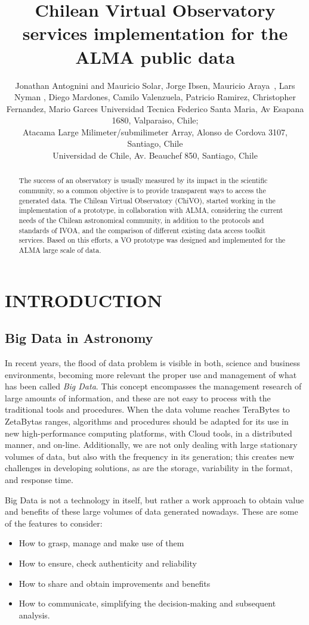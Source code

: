 \documentclass[]{spie}
\title{Chilean Virtual Observatory services implementation for the ALMA public data}
\author{Jonathan Antognini\supit{a} and Mauricio Solar\supit{a}, Jorge Ibsen\supit{b}, Mauricio Araya \supit{a}, 
Lars Nyman \supit{b}, Diego Mardones\supit{c}, Camilo Valenzuela\supit{a}, Patricio Ramirez\supit{a}, 
Christopher Fernandez\supit{a}, Mario Garces\supit{a}
\skiplinehalf
\supit{a}Universidad Tecnica Federico Santa Maria, Av Esapana 1680, Valparaiso, Chile; \\
\supit{b}Atacama Large Milimeter/submilimeter Array, Alonso de Cordova 3107, Santiago, Chile \\
\supit{c}Universidad de Chile, Av. Beauchef 850, Santiago, Chile \\
}
\begin{document}
 
\maketitle 

\begin{abstract}
The success of an observatory is usually measured by its impact in the
scientific community, so a common objective is to provide transparent ways to
access the generated data. The Chilean Virtual Observatory (ChiVO), started
working in the implementation of a prototype, in collaboration with ALMA,
considering the current needs of the Chilean astronomical community, in
addition to the protocols and standards of IVOA, and the comparison of
different existing data access toolkit services. Based on this efforts, a VO
prototype was designed and implemented for the ALMA large scale of data.
\end{abstract}


\section{INTRODUCTION}
\label{sec:intro}  %

\subsection{Big Data in Astronomy}
\label{sec:bdastronomy}
In recent years, the flood of data problem is visible in both, science and
business environments, becoming more relevant the proper use and management of
what has been called \emph{Big Data}. This concept encompasses the management research
of large amounts of information, and these are not easy to process with the
traditional tools and procedures.  When the data volume reaches TeraBytes to
ZetaBytas ranges, algorithms and procedures should be adapted for its use in
new high-performance computing platforms, with Cloud tools, in a distributed
manner, and on-line.  Additionally, we are not only dealing with large
stationary volumes of data, but also with the frequency in its generation; this
creates new challenges in developing solutions, as are the storage, variability
in the format, and response time.  

Big Data is not a technology in itself, but rather a work approach to obtain
value and benefits of these large volumes of data generated nowadays.   These
are some of the features to consider:
\begin{itemize}
\item How to grasp, manage and make use of them
\item How to ensure, check authenticity and reliability
\item How to share and obtain improvements and benefits
\item How to communicate, simplifying the decision-making and subsequent analysis.
\end{itemize}
\end{document}
